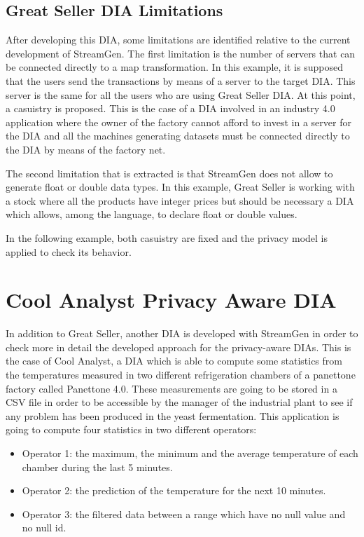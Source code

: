 \subsection{Great Seller DIA Limitations}

After developing this DIA, some limitations are identified relative to the current development of StreamGen. The first limitation is the number of servers that can be connected directly to a map transformation. In this example, it is supposed that the users send the transactions by means of a server to the target DIA. This server is the same for all the users who are using Great Seller DIA. At this point, a casuistry is proposed. This is the case of a DIA involved in an industry 4.0 application where the owner of the factory cannot afford to invest in a server for the DIA and all the machines generating datasets must be connected directly to the DIA by means of the factory net.

The second limitation that is extracted is that StreamGen does not allow to generate float or double data types. In this example, Great Seller is working with a stock where all the products have integer prices but should be necessary a DIA which allows, among the language, to declare float or double values.

In the following example, both casuistry are fixed and the privacy model is applied to check its behavior.

\section{Cool Analyst Privacy Aware DIA}

In addition to Great Seller, another DIA is developed with StreamGen in order to check more in detail the developed approach for the privacy-aware DIAs. This is the case of Cool Analyst, a DIA which is able to compute some statistics from the temperatures measured in two different refrigeration chambers of a panettone factory called Panettone 4.0. These measurements are going to be stored in a CSV file in order to be accessible by the manager of the industrial plant to see if any problem has been produced in the yeast fermentation. This application is going to compute four statistics in two different operators:

\begin{itemize}
\item Operator 1: the maximum, the minimum and the average temperature of each chamber during the last 5 minutes.
\item Operator 2: the prediction of the temperature for the next 10 minutes.
\item Operator 3: the filtered data between a range which have no null value and no null id.
\end{itemize}

